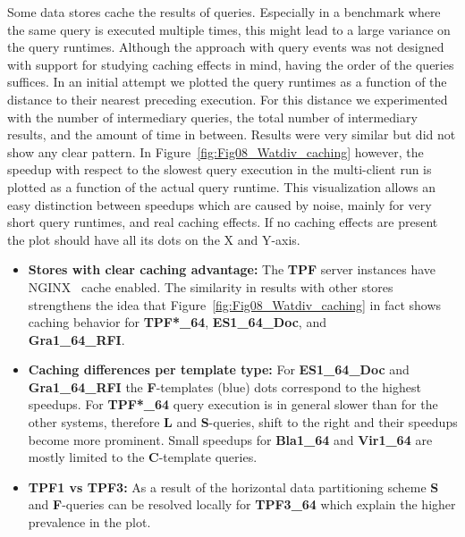 %



Some data stores cache the results of queries. Especially in a benchmark where the same query is executed multiple times, this might lead to a large variance on the query runtimes. Although the approach with query events was not designed with support for studying caching effects in mind, having the order of the queries suffices. 
In an initial attempt we plotted the query runtimes as a function of the distance to their nearest preceding execution. For this distance we experimented with the number of intermediary queries, the total number of intermediary results, and the amount of time in between. Results were very similar but did not show any clear pattern. 
In Figure~\ref{fig:Fig08_Watdiv_caching} however, the speedup with respect to the slowest query execution in the multi-client run is plotted as a function of the actual query runtime. This visualization allows an easy distinction between speedups which are caused by noise, mainly for very short query runtimes, and real caching effects. If no caching effects are present the plot should have all its dots on the X and Y-axis.
\begin{itemize}
	\item \textbf{Stores with clear caching advantage:} The \textbf{TPF} server instances have NGINX~\cite{nginx} cache enabled. The similarity in results with other stores strengthens the idea that Figure~\ref{fig:Fig08_Watdiv_caching} in fact shows caching behavior for 
	\textbf{TPF*\_64}, \textbf{ES1\_64\_Doc}, and \\ \textbf{Gra1\_64\_RFI}.
	
	\item \textbf{Caching differences per template type:} For \textbf{ES1\_64\_Doc} and \textbf{Gra1\_64\_RFI} the \textbf{F}-templates (blue) dots correspond to the highest speedups. For \textbf{TPF*\_64} query execution is in general slower than for the other systems, therefore \textbf{L} and \textbf{S}-queries, shift to the right and their speedups become more prominent. Small speedups for \textbf{Bla1\_64} and \textbf{Vir1\_64} are mostly limited to the \textbf{C}-template queries.
	\item \textbf{TPF1 vs TPF3:} As a result of the horizontal data partitioning scheme \textbf{S} and \textbf{F}-queries can be resolved locally for \textbf{TPF3\_64} which explain the higher prevalence in the plot.
\end{itemize}






